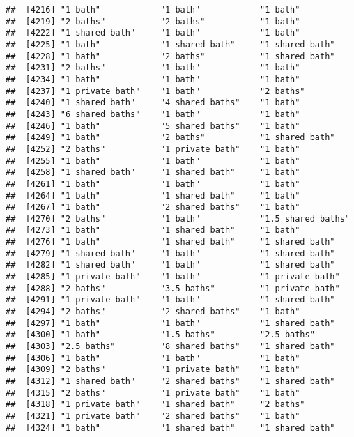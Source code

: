 \documentclass[
]{article}
\begin{document}
\begin{verbatim}
##  [4216] "1 bath"            "1 bath"            "1 bath"           
##  [4219] "2 baths"           "2 baths"           "1 bath"           
##  [4222] "1 shared bath"     "1 bath"            "1 bath"           
##  [4225] "1 bath"            "1 shared bath"     "1 shared bath"    
##  [4228] "1 bath"            "2 baths"           "1 shared bath"    
##  [4231] "2 baths"           "1 bath"            "1 bath"           
##  [4234] "1 bath"            "1 bath"            "1 bath"           
##  [4237] "1 private bath"    "1 bath"            "2 baths"          
##  [4240] "1 shared bath"     "4 shared baths"    "1 bath"           
##  [4243] "6 shared baths"    "1 bath"            "1 bath"           
##  [4246] "1 bath"            "5 shared baths"    "1 bath"           
##  [4249] "1 bath"            "2 baths"           "1 shared bath"    
##  [4252] "2 baths"           "1 private bath"    "1 bath"           
##  [4255] "1 bath"            "1 bath"            "1 bath"           
##  [4258] "1 shared bath"     "1 shared bath"     "1 bath"           
##  [4261] "1 bath"            "1 bath"            "1 bath"           
##  [4264] "1 bath"            "1 shared bath"     "1 bath"           
##  [4267] "1 bath"            "2 shared baths"    "1 bath"           
##  [4270] "2 baths"           "1 bath"            "1.5 shared baths" 
##  [4273] "1 bath"            "1 shared bath"     "1 bath"           
##  [4276] "1 bath"            "1 shared bath"     "1 shared bath"    
##  [4279] "1 shared bath"     "1 bath"            "1 shared bath"    
##  [4282] "1 shared bath"     "1 bath"            "1 shared bath"    
##  [4285] "1 private bath"    "1 bath"            "1 private bath"   
##  [4288] "2 baths"           "3.5 baths"         "1 private bath"   
##  [4291] "1 private bath"    "1 bath"            "1 shared bath"    
##  [4294] "2 baths"           "2 shared baths"    "1 bath"           
##  [4297] "1 bath"            "1 bath"            "1 shared bath"    
##  [4300] "1 bath"            "1.5 baths"         "2.5 baths"        
##  [4303] "2.5 baths"         "8 shared baths"    "1 shared bath"    
##  [4306] "1 bath"            "1 bath"            "1 bath"           
##  [4309] "2 baths"           "1 private bath"    "1 bath"           
##  [4312] "1 shared bath"     "2 shared baths"    "1 shared bath"    
##  [4315] "2 baths"           "1 private bath"    "1 bath"           
##  [4318] "1 private bath"    "1 shared bath"     "2 baths"          
##  [4321] "1 private bath"    "2 shared baths"    "1 bath"           
##  [4324] "1 bath"            "1 shared bath"     "1 shared bath"    

\end{verbatim}
\end{document}
